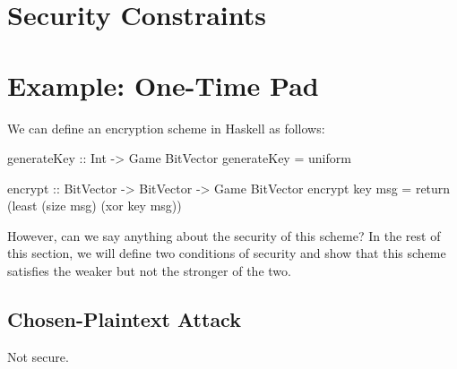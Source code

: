 

\section{Security Constraints}



\section{Example: One-Time Pad}

We can define an encryption scheme in Haskell as follows:
\begin{code}
    generateKey :: Int -> Game BitVector
    generateKey = uniform

    encrypt :: BitVector -> BitVector -> Game BitVector
    encrypt key msg = return (least (size msg) (xor key msg))
\end{code}

However, can we say anything about the security of this scheme?  In the rest of this section, we will define two
conditions of security and show that this scheme satisfies the weaker but not the stronger of the two.

\subsection{}

\subsection{Chosen-Plaintext Attack}

Not secure.


